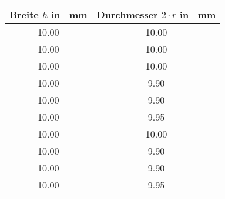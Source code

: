 \begin{center}
\begin{tabular}{c|c}
	Breite $h$ in \SI{}{\milli\metre}& Durchmesser $2 \cdot r$ in \SI{}{\milli\metre}	\\
	\hline
	10.00 & 10.00 \\
	10.00  & 10.00 \\
	10.00  & 10.00 \\
	10.00  & 9.90 \\
	10.00  & 9.90 \\
	10.00  & 9.95 \\
	10.00  & 10.00 \\
	10.00  & 9.90 \\
	10.00  & 9.90 \\
	10.00 & 9.95 \\
\end{tabular}
\label{tab:querschnitte}
\end{center}
